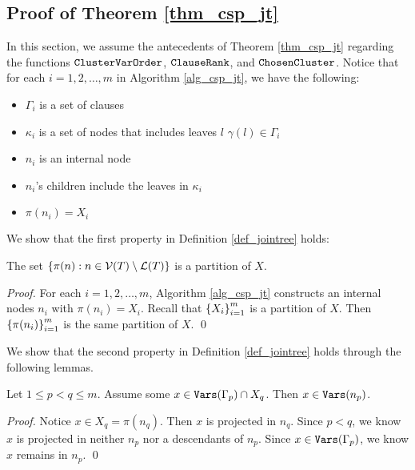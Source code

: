 
\subsection{Proof of Theorem \ref{thm_csp_jt}}

In this section, we assume the antecedents of Theorem \ref{thm_csp_jt} regarding the functions $\texttt{\upshape ClusterVarOrder}$, $\texttt{\upshape ClauseRank}$, and $\texttt{\upshape ChosenCluster}$.
Notice that for each $i = 1, 2, \ldots, m$ in Algorithm \ref{alg_csp_jt}, we have the following:
\begin{itemize}
    \item $\Gamma_i$ is a set of clauses
    \item $\kappa_i$ is a set of nodes that includes leaves $l$ \st{} $\gamma(l) \in \Gamma_i$
    \item $n_i$ is an internal node
    \item $n_i$'s children include the leaves in $\kappa_i$
    \item $\pi(n_i) = X_i$
\end{itemize}

We show that the first property in Definition \ref{def_jointree} holds:
\begin{lemma}
\label{lemma_prop1}
    The set $\left\{ \pi(n) : n \in \mathcal{V}(T) \setminus \mathcal{L}(T) \right\}$ is a partition of $X$.
\end{lemma}
\begin{proof}
    For each $i = 1, 2, \ldots, m$, Algorithm \ref{alg_csp_jt} constructs an internal nodes $n_i$ with $\pi(n_i) = X_i$.
    Recall that $\left\{ X_i \right\}_{i = 1}^m$ is a partition of $X$.
    Then $\left\{ \pi(n_i) \right\}_{i = 1}^m$ is the same partition of $X$.
\qed
\end{proof}

We show that the second property in Definition \ref{def_jointree} holds through the following lemmas.

\begin{lemma}
\label{lemma_unprojected}
    Let $1 \le p < q \le m$.
    Assume some $x \in \texttt{\upshape Vars}(\Gamma_p) \cap X_q$.
    Then $x \in \texttt{\upshape Vars}(n_p)$.
\end{lemma}
\begin{proof}
    Notice $x \in X_q = \pi(n_q)$.
    Then $x$ is projected in $n_q$.
    Since $p < q$, we know $x$ is projected in neither $n_p$ nor a descendants of $n_p$.
    Since $x \in \texttt{\upshape Vars}(\Gamma_p)$, we know $x$ remains in $n_p$.
\qed
\end{proof}

